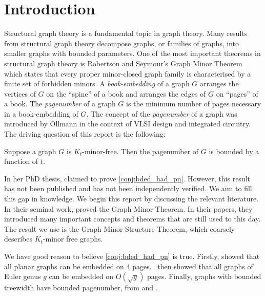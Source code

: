\chapter{Introduction}\label{sec:introduction}
Structural graph theory is a fundamental topic in graph theory. Many results from structural graph theory decompose graphs, or families of graphs, into smaller graphs with bounded parameters. One of the most important theorems in structural graph theory is Robertson and Seymour's Graph Minor Theorem \cite{robertsonGraphMinorsXX2004} which states that every proper minor-closed graph family is characterised by a finite set of forbidden minors.
A \textit{book-embedding} of a graph $G$ arranges the vertices of $G$ on the ``spine'' of a book and arranges the edges of $G$ on ``pages'' of a book. The \textit{pagenumber} of a graph \(G\) is the minimum number of pages necessary in a book-embedding of \(G\). The concept of the \textit{pagenumber} of a graph was introduced by Ollmann \cite{ollmannBookThicknessVarious1973} in the context of VLSI design and integrated circuitry. 
The driving question of this report is the following:
\begin{conjecture}\label{conj:bded_had_pn}
	Suppose a graph $G$ is $K_t$-minor-free. Then the pagenumber of \(G\) is bounded by a function of \(t\).
\end{conjecture}
In her PhD thesis, \textcite{Blankenship-PhD03} claimed to prove \cref{conj:bded_had_pn}. However, this result has not been published and has not been independently verified. We aim to fill this gap in knowledge. 
We begin this report by discussing the relevant literature. In their seminal work, \textcite{robertsonGraphMinorsXVI2003} proved the Graph Minor Theorem. In their papers, they introduced many important concepts and theorems that are still used to this day. The result we use is the Graph Minor Structure Theorem, which coarsely describes $K_t$-minor free graphs.

We have good reason to believe \cref{conj:bded_had_pn} is true. Firstly, \textcite{yannakakisEmbeddingPlanarGraphs1989} showed that all planar graphs can be embedded on 4 pages.\ \textcite{malitzGenusGraphsHave1994} then showed that all graphs of Euler genus $g$ can be embedded on $O(\sqrt{g})$ pages. Finally, graphs with bounded treewidth have bounded pagenumber, from \textcite{ganleyPagenumberTrees2001} and \textcite{dujmovicGraphTreewidthGeometric2007}.

